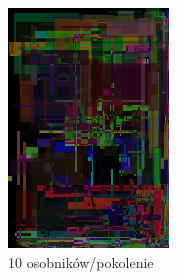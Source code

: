 \begin{figure}[!htb]
    \centering
    \begin{subfigure}[b]{0.3\textwidth}
        \centering
         \includegraphics[width=\textwidth]{images/mona/10000_10_2/img_0_it_1000_best.png}
         \caption{10 osobników/pokolenie}
    \end{subfigure}
    \begin{subfigure}[b]{0.3\textwidth}
        \centering

\end{subfigure}
\end{figure}
